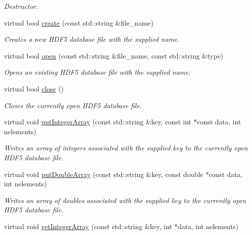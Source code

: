 \begin{DoxyCompactItemize}
\begin{DoxyCompactList}\small\item\em Destructor. \end{DoxyCompactList}\item 
virtual bool \hyperlink{class_c_a_r_o_m_1_1_h_d_f_database_ab86ee99a63cf0259ed1c87d57f3b0960}{create} (const std\-::string \&file\-\_\-name)
\begin{DoxyCompactList}\small\item\em Creates a new H\-D\-F5 database file with the supplied name. \end{DoxyCompactList}\item 
virtual bool \hyperlink{class_c_a_r_o_m_1_1_h_d_f_database_ad221573d351a1f0a2e2356e1a4320089}{open} (const std\-::string \&file\-\_\-name, const std\-::string \&type)
\begin{DoxyCompactList}\small\item\em Opens an existing H\-D\-F5 database file with the supplied name. \end{DoxyCompactList}\item 
virtual bool \hyperlink{class_c_a_r_o_m_1_1_h_d_f_database_a94c9a5972e98e4426c3bdc255ee1dfdc}{close} ()
\begin{DoxyCompactList}\small\item\em Closes the currently open H\-D\-F5 database file. \end{DoxyCompactList}\item 
virtual void \hyperlink{class_c_a_r_o_m_1_1_h_d_f_database_a8f628624800817cdbe90ab0407c28305}{put\-Integer\-Array} (const std\-::string \&key, const int $\ast$const data, int nelements)
\begin{DoxyCompactList}\small\item\em Writes an array of integers associated with the supplied key to the currently open H\-D\-F5 database file. \end{DoxyCompactList}\item 
virtual void \hyperlink{class_c_a_r_o_m_1_1_h_d_f_database_ad30894245e7ce642f24be9328b86b91b}{put\-Double\-Array} (const std\-::string \&key, const double $\ast$const data, int nelements)
\begin{DoxyCompactList}\small\item\em Writes an array of doubles associated with the supplied key to the currently open H\-D\-F5 database file. \end{DoxyCompactList}\item 
virtual void \hyperlink{class_c_a_r_o_m_1_1_h_d_f_database_a9c12c03cef05d3144c21de5f52ff7494}{get\-Integer\-Array} (const std\-::string \&key, int $\ast$data, int nelements)

\end{DoxyCompactItemize}
